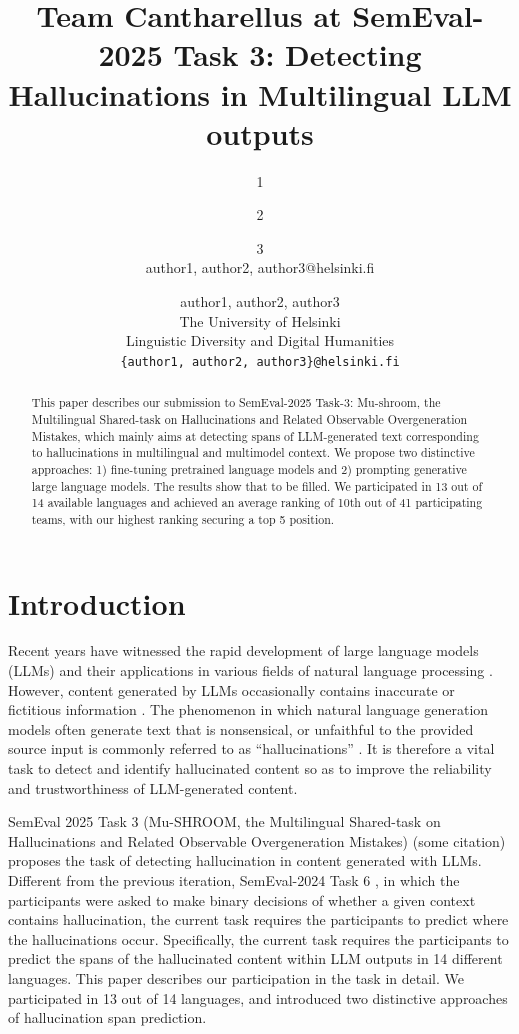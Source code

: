 \documentclass[11pt]{article}
\title{Team Cantharellus at SemEval-2025 Task 3: Detecting Hallucinations in Multilingual LLM outputs}
\author{1 \and 2 \and 3 \\
         {author1, author2, author3}@helsinki.fi}
\author{author1, author2, author3 \\ %
  The University of Helsinki \\
  Linguistic Diversity and Digital Humanities  \\
  \texttt{\{author1, author2, author3\}@helsinki.fi} \\}
\begin{document}
\maketitle
\begin{abstract}
This paper describes our submission to SemEval-2025 Task-3: Mu-shroom, the Multilingual Shared-task on Hallucinations and Related Observable Overgeneration Mistakes, which mainly aims at detecting spans of LLM-generated text corresponding to hallucinations in multilingual and multimodel context. We propose two distinctive approaches: 1) fine-tuning pretrained language models and 2) prompting generative large language models. The results show that {to be filled}. We participated in 13 out of 14 available languages and achieved an average ranking of 10th out of 41 participating teams, with our highest ranking securing a top 5 position.


\end{abstract}


\section{Introduction}
Recent years have witnessed the rapid development of large language models (LLMs) and their applications in various fields of natural language processing \cite{wei2022chain, zhao2023survey}. However, content generated by LLMs occasionally contains inaccurate or fictitious information \cite{perkovic2024hallucinations}. The phenomenon in which natural language generation models often generate text that is nonsensical, or unfaithful to the provided source input is commonly referred to as “hallucinations” \cite{ji2023survey}. It is therefore a vital task to detect and identify hallucinated content so as to improve the reliability and trustworthiness of LLM-generated content.

SemEval 2025 Task 3 (Mu-SHROOM, the Multilingual Shared-task on Hallucinations and Related Observable Overgeneration Mistakes) (some citation) proposes the task of detecting hallucination in content generated with LLMs. Different from the previous iteration, SemEval-2024 Task 6 \cite{mickus2024semeval}, in which the participants were asked to make binary decisions of whether a given context contains hallucination, the current task requires the participants to predict where the hallucinations occur. Specifically, the current task requires the participants to predict the spans of the hallucinated content within LLM outputs in 14 different languages.
This paper describes our participation in the task in detail. We participated in 13 out of 14 languages, and introduced two distinctive approaches of hallucination span prediction.
\end{document}
